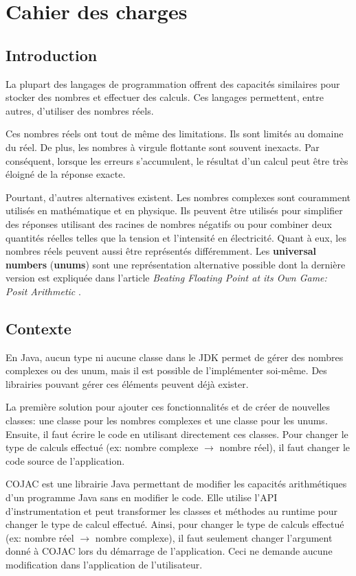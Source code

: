\chapter{Cahier des charges}

\section{Introduction}

La plupart des langages de programmation offrent des capacités similaires pour stocker des nombres et effectuer des calculs. Ces langages permettent, entre autres, d'utiliser  des nombres réels.

Ces nombres réels ont tout de même des limitations. Ils sont limités au domaine du réel. De plus, les nombres à virgule flottante sont souvent inexacts. Par conséquent, lorsque les erreurs s'accumulent, le résultat d'un calcul peut être très éloigné de la réponse exacte.

Pourtant, d'autres alternatives existent. Les nombres complexes sont couramment utilisés en mathématique et en physique. Ils peuvent être utilisés pour simplifier des réponses utilisant des racines de nombres négatifs ou pour combiner deux quantités réelles telles que la tension et l'intensité en électricité. Quant à eux, les nombres réels peuvent aussi être représentés différemment. Les \textbf{universal numbers} (\textbf{unums}) sont une représentation alternative possible dont la dernière version est expliquée dans l'article \textit{Beating Floating Point at its Own Game: Posit Arithmetic} \cite{posit}.


\section{Contexte}

En Java, aucun type ni aucune classe dans le JDK permet de gérer des nombres complexes ou des unum, mais il est possible de l'implémenter soi-même. Des librairies pouvant gérer ces éléments peuvent déjà exister.

La première solution pour ajouter ces fonctionnalités et de créer de nouvelles classes: une classe pour les nombres complexes et une classe pour les unums. Ensuite, il faut écrire le code en utilisant directement ces classes. Pour changer le type de calculs effectué (ex: nombre complexe $\rightarrow$ nombre réel), il faut changer le code source de l'application.

COJAC \cite{COJAC} est une librairie Java permettant de modifier les capacités arithmétiques d'un programme Java sans en modifier le code. Elle utilise l'API d'instrumentation et peut transformer les classes et méthodes au runtime pour changer le type de calcul effectué. Ainsi, pour changer le type de calculs effectué (ex: nombre réel $\rightarrow$ nombre complexe), il faut seulement changer l'argument donné à COJAC \cite{COJAC} lors du démarrage de l'application. Ceci ne demande aucune modification dans l'application de l'utilisateur.

